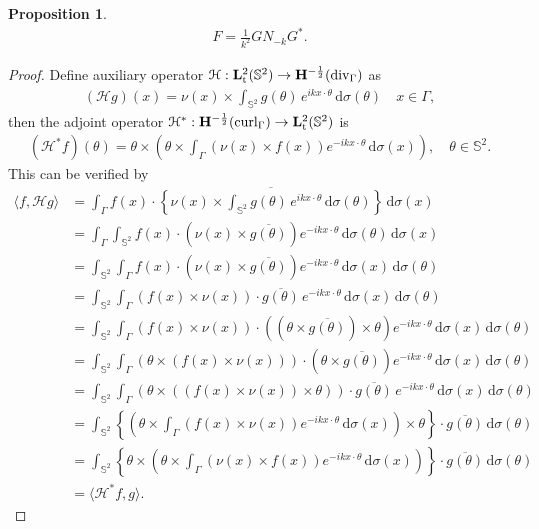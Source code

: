 \documentclass[a4paper,12pt]{article}
\theoremstyle{definition}
\newtheorem{prp}{Proposition}
\newcommand\bdr{\Gamma}
\newcommand\Div{\divv_\bdr}
\newcommand\Curl{\curl_\bdr}
\newcommand\lTT{{\bf L}^2_\text{t}}
\newcommand\lTS{\lTT(\mathbb{S}^2)}
\newcommand\Hhm{{\bf H}^{-\frac{1}{2}}}
\newcommand\lTD{\Hhm(\Div)}
\newcommand\lTC{\Hhm(\Curl)}
\newcommand\ints[2][y]{\int_{\bdr}#2\,\text{d}\sigma(#1)}
\newcommand\intc[2][(\theta)]{\int_{\mathbb{S}^2}#2\,\text{d}\sigma#1}
\DeclareMathOperator\curl{curl}
\DeclareMathOperator\divv{div}
\begin{document}
\begin{prp}
  \begin{align*}
    F=\frac{1}{k^2}GN_{-k}G^*.
  \end{align*}
\end{prp}

\begin{proof}
  Define auxiliary operator $\mathcal{H}:\lTS\rightarrow\lTD$ as
  \begin{align*}
    \left(\mathcal{H}g\right)(x)=\nu(x)\times\intc{g(\theta)\,e^{ikx\cdot\theta}}\quad x\in\bdr,
  \end{align*}
then the adjoint operator $\mathcal{H}^*:\lTC\rightarrow\lTS$ is 
  \begin{align}
    \left(\mathcal{H}^*f\right)(\theta)=\theta\times\left(\theta\times\ints[x]{\left(\nu(x)\times f(x)\right)e^{-ik x\cdot\theta}}\right),\quad\theta\in\mathbb{S}^2.
  \end{align}
This can be verified by
  \begin{align*}
    \langle f, \mathcal{H}g\rangle &= \ints[x]{f(x)\cdot\overline{\left\{\nu(x)\times\intc{g(\theta)\,e^{i k x\cdot\theta}}\right\}}} \\
    &=\ints[x]{\intc{f(x)\cdot\left(\nu(x)\times\overline{g(\theta)}\right)e^{-i k x\cdot\theta}}} \\
    &=\intc{\ints[x]{f(x)\cdot\left(\nu(x)\times\overline{g(\theta)}\right)e^{-i k x\cdot\theta}}} \\
    &=\intc{\ints[x]{\left(f(x)\times \nu(x)\right)\cdot\overline{g(\theta)}\,e^{-i k x\cdot\theta}}} \\
    &=\intc{\ints[x]{\left(f(x)\times \nu(x)\right)\cdot\left(\left(\theta\times\overline{g(\theta)}\right)\times\theta\right)e^{-i k x\cdot\theta}}} \\
    &=\intc{\ints[x]{\left(\theta\times\left(f(x)\times\nu(x)\right)\right)\cdot\left(\theta\times\overline{g(\theta)}\right)e^{-i k x\cdot\theta}}} \\
    &=\intc{\ints[x]{\left(\theta\times\left(\left(f(x)\times \nu(x)\right)\times\theta\right)\right)\cdot\overline{g(\theta)}\,e^{-i k x\cdot\theta}}} \\
    &=\intc{\left\{\left(\theta\times\ints[x]{\left(f(x)\times \nu(x)\right)e^{-i k x\cdot\theta}}\right)\times\theta\right\}\cdot\overline{g(\theta)}} \\
    &=\intc{\left\{\theta\times\left(\theta\times\ints[x]{\left(\nu(x)\times f(x)\right)e^{-i k x\cdot\theta}}\right)\right\}\cdot\overline{g(\theta)}} \\
    &=\langle\mathcal{H}^*f, g\rangle.
  \end{align*} 


\end{proof}
\end{document}
